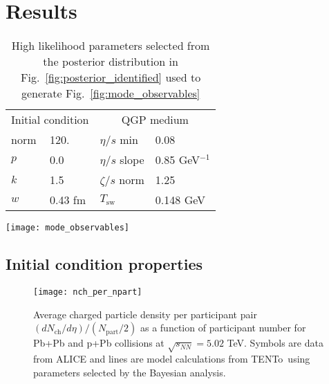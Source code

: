 \documentclass[aps,prc,reprint,amsmath,nofootinbib]{revtex4-1}
\newcommand{\trento}{T\raisebox{-0.5ex}{R}ENTo}
\newcommand{\nch}{N_\text{ch}}
\newcommand{\npart}{N_\text{part}}
\newcommand{\sqrts}{\sqrt{s_{NN}}}
\begin{document}
\section{Results}

\begin{table}
    \caption{High likelihood parameters selected from the posterior distribution in Fig.~\ref{fig:posterior_identified} used to generate Fig.~\ref{fig:mode_observables}}
    \begin{ruledtabular}    
        \begin{tabular}{llll}
            \multicolumn{2}{c}{Initial condition} & \multicolumn{2}{c}{QGP medium} \\
            \noalign{\smallskip}\hline\noalign{\smallskip}
            norm & 120.          &  $\eta/s$ min   & 0.08       \\
            $p$  & 0.0           &  $\eta/s$ slope & 0.85 GeV$^{-1}$   \\
            $k$  & 1.5           &  $\zeta/s$ norm & 1.25       \\
            $w$  & 0.43 fm       &  $T_\text{sw}$  & 0.148 GeV  \\
        \end{tabular}
    \end{ruledtabular}
    \label{table:likely_param}
\end{table}

\begin{figure*}
    \texttt{[image: mode\_observables]}
    \caption{Top row: model calculations of identified yields $dN/dy$, mean $p_T$ and flow cumulants $v_n\{2\}$ as a function of collision centrality using high-likelihood parameters (listed in table \ref{table:likely_param}) determined from the posterior in Fig.~\ref{fig:posterior_identified}. Symbols with error bars show data from ALICE and lines show results of the model. Bottom row: ratio of the model divided by experiment. Gray band indicates 10\% discrepancy between the model and experiment.}
    \label{fig:mode_observables}
\end{figure*}


\subsection{Initial condition properties}
\begin{figure}
    \texttt{[image: nch\_per\_npart]}
    \caption{Average charged particle density per participant pair $(d\nch/d\eta)/(\npart/2)$ as a function of participant number for Pb+Pb and p+Pb collisions at $\sqrts=5.02$ TeV.
    Symbols are data from ALICE and lines are model calculations from \protect\trento\ using parameters selected by the Bayesian analysis.}
\end{figure}
\end{document}
